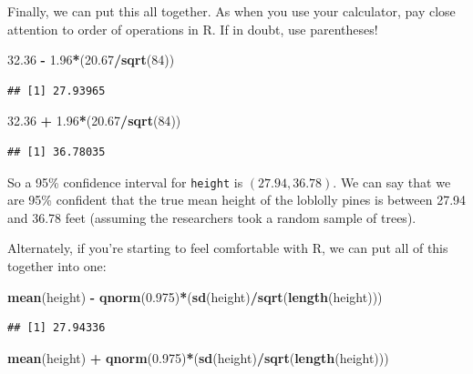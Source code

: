 \documentclass[
]{book}
\newenvironment{Shaded}{\begin{snugshade}}{\end{snugshade}}
\newcommand{\DecValTok}[1]{\textcolor[rgb]{0.00,0.00,0.81}{#1}}
\newcommand{\FloatTok}[1]{\textcolor[rgb]{0.00,0.00,0.81}{#1}}
\newcommand{\FunctionTok}[1]{\textcolor[rgb]{0.13,0.29,0.53}{\textbf{#1}}}
\newcommand{\NormalTok}[1]{#1}
\newcommand{\SpecialCharTok}[1]{\textcolor[rgb]{0.81,0.36,0.00}{\textbf{#1}}}
\begin{document}
Finally, we can put this all together. As when you use your calculator, pay close attention to order of operations in R. If in doubt, use parentheses!

\begin{Shaded}
\begin{Highlighting}[]
\FloatTok{32.36} \SpecialCharTok{{-}} \FloatTok{1.96}\SpecialCharTok{*}\NormalTok{(}\FloatTok{20.67}\SpecialCharTok{/}\FunctionTok{sqrt}\NormalTok{(}\DecValTok{84}\NormalTok{))}
\end{Highlighting}
\end{Shaded}

\begin{verbatim}
## [1] 27.93965
\end{verbatim}

\begin{Shaded}
\begin{Highlighting}[]
\FloatTok{32.36} \SpecialCharTok{+} \FloatTok{1.96}\SpecialCharTok{*}\NormalTok{(}\FloatTok{20.67}\SpecialCharTok{/}\FunctionTok{sqrt}\NormalTok{(}\DecValTok{84}\NormalTok{))}
\end{Highlighting}
\end{Shaded}

\begin{verbatim}
## [1] 36.78035
\end{verbatim}

So a 95\% confidence interval for \texttt{height} is \((27.94, 36.78)\). We can say that we are 95\% confident that the true mean height of the loblolly pines is between 27.94 and 36.78 feet (assuming the researchers took a random sample of trees).

Alternately, if you're starting to feel comfortable with R, we can put all of this together into one:

\begin{Shaded}
\begin{Highlighting}[]
\FunctionTok{mean}\NormalTok{(height) }\SpecialCharTok{{-}} \FunctionTok{qnorm}\NormalTok{(}\FloatTok{0.975}\NormalTok{)}\SpecialCharTok{*}\NormalTok{(}\FunctionTok{sd}\NormalTok{(height)}\SpecialCharTok{/}\FunctionTok{sqrt}\NormalTok{(}\FunctionTok{length}\NormalTok{(height)))}
\end{Highlighting}
\end{Shaded}

\begin{verbatim}
## [1] 27.94336
\end{verbatim}

\begin{Shaded}
\begin{Highlighting}[]
\FunctionTok{mean}\NormalTok{(height) }\SpecialCharTok{+} \FunctionTok{qnorm}\NormalTok{(}\FloatTok{0.975}\NormalTok{)}\SpecialCharTok{*}\NormalTok{(}\FunctionTok{sd}\NormalTok{(height)}\SpecialCharTok{/}\FunctionTok{sqrt}\NormalTok{(}\FunctionTok{length}\NormalTok{(height)))}
\end{Highlighting}
\end{Shaded}
\end{document}
